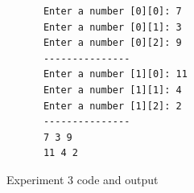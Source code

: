 \documentclass[12pt,titlepage]{article}
\begin{document}
\begin{enumerate}
{        \begin{verbatim}
            Enter a number [0][0]: 7
            Enter a number [0][1]: 3
            Enter a number [0][2]: 9
            ---------------
            Enter a number [1][0]: 11
            Enter a number [1][1]: 4
            Enter a number [1][2]: 2
            ---------------
            7 3 9
            11 4 2
        \end{verbatim}

        \begin{figure}[h]
            \centering
            \caption{Experiment 3 code and output}
        \end{figure}
    }
\end{enumerate}

\pagebreak
\end{document}
